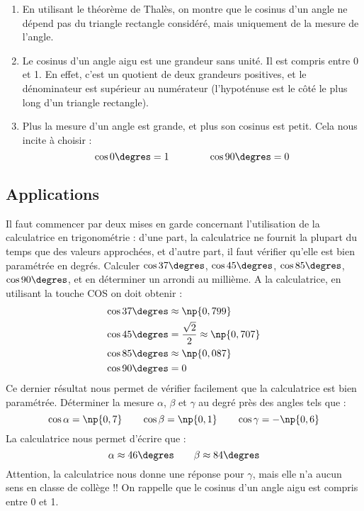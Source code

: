 \begin{propriete}
	\begin{enumerate}
		\item En utilisant le théorème de Thalès, on montre que le cosinus d'un angle ne dépend pas du triangle rectangle considéré, mais uniquement de la mesure de l'angle. 
		\item Le  cosinus d'un angle aigu est une grandeur sans unité. Il est compris entre 0 et 1. En effet, c'est un quotient de deux grandeurs positives, et le dénominateur est supérieur au numérateur (l'hypoténuse est le côté le plus long d'un triangle rectangle).
		\item Plus la mesure d'un angle est grande, et plus son cosinus  est petit. Cela nous incite à choisir :
		\[\cos 0\degres = 1\qquad \qquad\cos 90\degres=0\]  
	\end{enumerate}


\end{propriete}	
	
	
	\subsection{Applications}
	\begin{methode*2*2}
Il faut commencer par deux mises en garde concernant l'utilisation de la calculatrice en trigonométrie : d'une part, la calculatrice ne fournit la plupart du temps que des valeurs approchées, et d'autre part, il faut vérifier qu'elle est bien paramétrée en degrés.
	\exercice
Calculer $\cos 37\degres$, $\cos 45\degres$, $\cos 85\degres$, $\cos 90\degres$, et en déterminer un arrondi au millième.
	\correction
A la calculatrice, en utilisant la touche COS on doit obtenir :
\begin{align*}
\cos 37\degres & \approx \np{0,799}\\
\cos 45\degres & = \dfrac{\sqrt{2}}{2}\approx\np{0,707}\\
\cos 85\degres & \approx \np{0,087}\\
\cos 90\degres & = 0
\end{align*}
Ce dernier résultat nous permet de vérifier facilement que la calculatrice est bien paramétrée.
	\exercice 
Déterminer la mesure $\alpha$, $\beta$ et $\gamma$ au degré près des angles tels que :
\[\cos \alpha = \np{0,7}\qquad\cos \beta = \np{0,1}\qquad\cos \gamma = -\np{0,6} \]
	\correction
La calculatrice nous permet d'écrire que :
\[\alpha\approx 46\degres\qquad\beta\approx84\degres\]
Attention, la calculatrice nous donne une réponse pour $\gamma$, mais elle n'a aucun sens en classe de collège !! On rappelle que le cosinus d'un angle aigu est compris entre 0 et 1.
	\end{methode*2*2}
		


